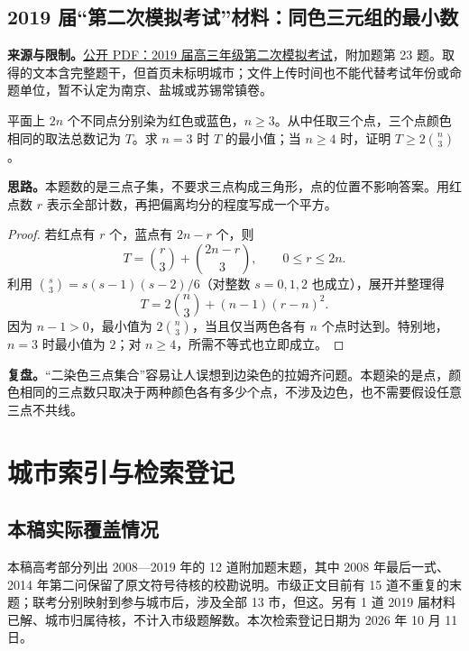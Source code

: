 \documentclass[UTF8]{ctexart}
\begin{document}
\subsection{2019 届“第二次模拟考试”材料：同色三元组的最小数}\label{sec:u2019}
\textbf{来源与限制。}\href{https://dfiles.jiajiaoban.com/ohr/2020/03/23/120155_5e7834b332ec4.pdf}{公开 PDF：2019 届高三年级第二次模拟考试}，附加题第 23 题。取得的文本含完整题干，但首页未标明城市；文件上传时间也不能代替考试年份或命题单位，暂不认定为南京、盐城或苏锡常镇卷。
\begin{example}[题意]
平面上 $2n$ 个不同点分别染为红色或蓝色，$n\geq3$。从中任取三个点，三个点颜色相同的取法总数记为 $T$。求 $n=3$ 时 $T$ 的最小值；当 $n\geq4$ 时，证明 $T\geq2\binom n3$。
\end{example}
\textbf{思路。}本题数的是三点子集，不要求三点构成三角形，点的位置不影响答案。用红点数 $r$ 表示全部计数，再把偏离均分的程度写成一个平方。
\begin{proof}
若红点有 $r$ 个，蓝点有 $2n-r$ 个，则
\[
T=\binom r3+\binom{2n-r}3,
\qquad 0\leq r\leq2n.
\]
利用 $\binom s3=s(s-1)(s-2)/6$（对整数 $s=0,1,2$ 也成立），展开并整理得
\[
T=2\binom n3+(n-1)(r-n)^2.
\]
因为 $n-1>0$，最小值为 $2\binom n3$，当且仅当两色各有 $n$ 个点时达到。特别地，$n=3$ 时最小值为 $2$；对 $n\geq4$，所需不等式也立即成立。
\end{proof}
\textbf{复盘。}“二染色三点集合”容易让人误想到边染色的拉姆齐问题。本题染的是点，颜色相同的三点数只取决于两种颜色各有多少个点，不涉及边色，也不需要假设任意三点不共线。

\section{城市索引与检索登记}\label{sec:register}
\subsection{本稿实际覆盖情况}
本稿高考部分列出 2008—2019 年的 12 道附加题末题，其中 2008 年最后一式、2014 年第二问保留了原文符号待核的校勘说明。市级正文目前有 15 道不重复的末题；联考分别映射到参与城市后，涉及全部 13 市，但这。另有 1 道 2019 届材料已解、城市归属待核，不计入市级题解数。本次检索登记日期为 2026 年 10 月 11 日。
\end{document}
